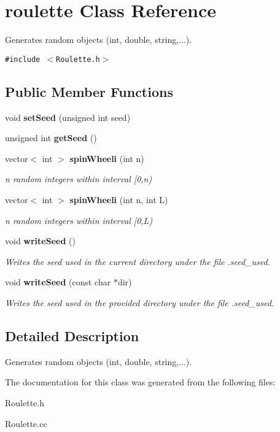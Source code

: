 \section{roulette Class Reference}
\label{classroulette}
Generates random objects (int, double, string,...).  


{\tt \#include $<$Roulette.h$>$}

\subsection*{Public Member Functions}
\begin{CompactItemize}
\item 
void {\bf set\-Seed} (unsigned int seed)\label{classroulette_a1}

\item 
unsigned int {\bf get\-Seed} ()\label{classroulette_a2}

\item 
vector$<$ int $>$ {\bf spin\-Wheeli} (int n)\label{classroulette_a3}

\begin{CompactList}\small\item\em n random integers within interval [0,n) \item\end{CompactList}\item 
vector$<$ int $>$ {\bf spin\-Wheeli} (int n, int L)\label{classroulette_a4}

\begin{CompactList}\small\item\em n random integers within interval [0,L) \item\end{CompactList}\item 
void {\bf write\-Seed} ()\label{classroulette_a5}

\begin{CompactList}\small\item\em Writes the seed used in the current directory under the file .seed\_\-used. \item\end{CompactList}\item 
void {\bf write\-Seed} (const char $\ast$dir)\label{classroulette_a6}

\begin{CompactList}\small\item\em Writes the seed used in the provided directory under the file .seed\_\-used. \item\end{CompactList}\end{CompactItemize}


\subsection{Detailed Description}
Generates random objects (int, double, string,...). 



The documentation for this class was generated from the following files:\begin{CompactItemize}
\item 
Roulette.h\item 
Roulette.cc\end{CompactItemize}
